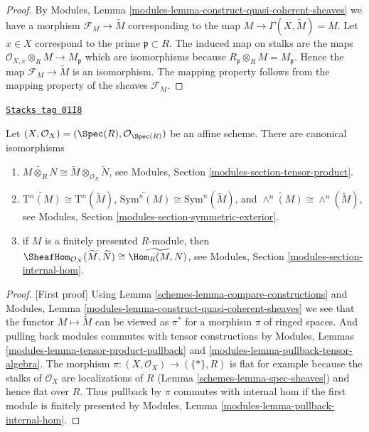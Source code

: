 \begin{proof}
By Modules, Lemma \ref{modules-lemma-construct-quasi-coherent-sheaves}
we have a morphism $\mathcal{F}_M \to \widetilde M$ corresponding
to the map $M \to \Gamma(X, \widetilde M) = M$. Let $x \in X$
correspond to the prime $\mathfrak p \subset R$.
The induced map on stalks are the maps
$\mathcal{O}_{X, x} \otimes_R M \to M_{\mathfrak p}$
which are isomorphisms because
$R_{\mathfrak p} \otimes_R M = M_{\mathfrak p}$.
Hence the map $\mathcal{F}_M \to \widetilde M$ is an isomorphism.
The mapping property follows from the mapping property of
the sheaves $\mathcal{F}_M$.
\end{proof}

\begin{lemma}
\label{schemes-lemma-widetilde-constructions}
\href{https://stacks.math.columbia.edu/tag/01I8}{\texttt{Stacks tag 01I8}}

Let $(X, \mathcal{O}_X) = (\Spec(R), \mathcal{O}_{\Spec(R)})$
be an affine scheme. There are canonical isomorphisms
\begin{enumerate}
\item
$
\widetilde{M \otimes_R N}
\cong
\widetilde M \otimes_{\mathcal{O}_X} \widetilde N
$,
see Modules, Section \ref{modules-section-tensor-product}.
\item
$
\widetilde{\text{T}^n(M)}
\cong
\text{T}^n(\widetilde M)
$,
$
\widetilde{\text{Sym}^n(M)}
\cong
\text{Sym}^n(\widetilde M)
$, and
$
\widetilde{\wedge^n(M)}
\cong
\wedge^n(\widetilde M)
$,
see
Modules, Section \ref{modules-section-symmetric-exterior}.
\item if $M$ is a finitely presented $R$-module, then
$
\SheafHom_{\mathcal{O}_X}(\widetilde M, \widetilde N)
\cong
\widetilde{\Hom_R(M,  N)}
$,
see
Modules, Section \ref{modules-section-internal-hom}.
\end{enumerate}
\end{lemma}

\begin{proof}
[First proof]
Using Lemma \ref{schemes-lemma-compare-constructions} and
Modules, Lemma \ref{modules-lemma-construct-quasi-coherent-sheaves}
we see that the functor $M \mapsto \widetilde M$ can be viewed
as $\pi^*$ for a morphism $\pi$ of ringed spaces.
And pulling back modules commutes with tensor constructions by
Modules, Lemmas \ref{modules-lemma-tensor-product-pullback}
and \ref{modules-lemma-pullback-tensor-algebra}.
The morphism $\pi : (X, \mathcal{O}_X) \to (\{*\}, R)$ is
flat for example because the stalks of $\mathcal{O}_X$ are
localizations of $R$ (Lemma \ref{schemes-lemma-spec-sheaves})
and hence flat over $R$. Thus pullback by $\pi$ commutes
with internal hom if the first module is finitely presented by
Modules, Lemma \ref{modules-lemma-pullback-internal-hom}.
\end{proof}

